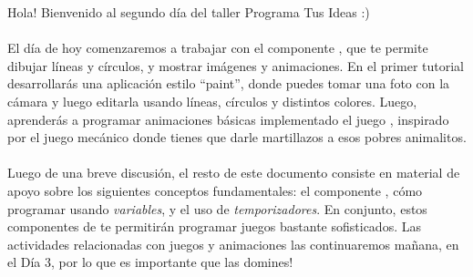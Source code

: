 Hola! Bienvenido al segundo día del taller Programa Tus Ideas :)

\paragraph{}
El día de hoy comenzaremos a trabajar con el componente
, que te permite dibujar líneas y círculos, y
mostrar imágenes y animaciones. En el primer tutorial desarrollarás
una aplicación estilo ``paint'', donde puedes tomar una foto con la
cámara y luego editarla usando líneas, círculos y distintos colores.
Luego, aprenderás a programar animaciones básicas implementado el
juego , inspirado por el juego mecánico donde
tienes que darle martillazos a esos pobres animalitos.

\paragraph{}
Luego de una breve discusión, el resto de este documento consiste en
material de apoyo sobre los siguientes conceptos fundamentales: el
componente , cómo programar usando \emph{variables},
y el uso de \emph{temporizadores}. En conjunto, estos componentes de
\AppInventor te permitirán programar juegos bastante sofisticados. Las
actividades relacionadas con juegos y animaciones las continuaremos
mañana, en el Día 3, por lo que es importante que las domines!

